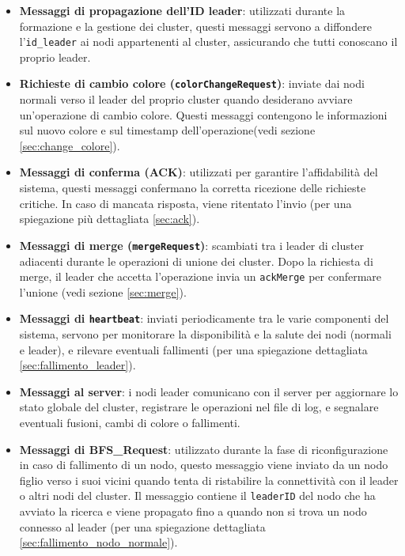 \documentclass[12pt, a4paper]{report}
\begin{document}
\begin{itemize}
    \item \textbf{Messaggi di propagazione dell'ID leader}: utilizzati durante la formazione e la gestione dei cluster, questi messaggi servono a diffondere l'\texttt{id\_leader} ai nodi appartenenti al cluster, assicurando che tutti conoscano il proprio leader.
    \item \textbf{Richieste di cambio colore (\texttt{colorChangeRequest})}: inviate dai nodi normali verso il leader del proprio cluster quando desiderano avviare un'operazione di cambio colore. Questi messaggi contengono le informazioni sul nuovo colore e sul timestamp dell'operazione(vedi sezione \ref{sec:change_colore}).
    \item \textbf{Messaggi di conferma (ACK)}: utilizzati per garantire l'affidabilit\`a del sistema, questi messaggi confermano la corretta ricezione delle richieste critiche. In caso di mancata risposta, viene ritentato l'invio (per una spiegazione pi\`u dettagliata \ref{sec:ack}).
    \item \textbf{Messaggi di merge (\texttt{mergeRequest})}: scambiati tra i leader di cluster adiacenti durante le operazioni di unione dei cluster. Dopo la richiesta di merge, il leader che accetta l'operazione invia un \texttt{ackMerge} per confermare l'unione (vedi sezione \ref{sec:merge}).
    \item \textbf{Messaggi di \texttt{heartbeat}}: inviati periodicamente tra le varie componenti del sistema, servono per monitorare la disponibilit\`a e la salute dei nodi (normali e leader), e rilevare eventuali fallimenti (per una spiegazione dettagliata \ref{sec:fallimento_leader}). 
    \item \textbf{Messaggi al server}: i nodi leader comunicano con il server per aggiornare lo stato globale del cluster, registrare le operazioni nel file di log, e segnalare eventuali fusioni, cambi di colore o fallimenti.
    \item \textbf{Messaggi di BFS\_Request}: utilizzato durante la fase di riconfigurazione in caso di fallimento di un nodo, questo messaggio viene inviato da un nodo figlio verso i suoi vicini quando tenta di ristabilire la connettivit\`a con il leader o altri nodi del cluster. Il messaggio contiene il \texttt{leaderID} del nodo che ha avviato la ricerca e viene propagato fino a quando non si trova un nodo connesso al leader (per una spiegazione dettagliata \ref{sec:fallimento_nodo_normale}). 
\end{itemize}
\end{document}
